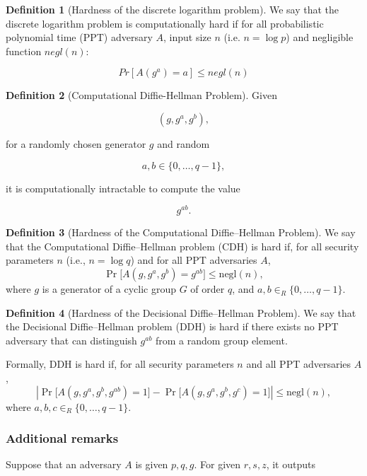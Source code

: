 \documentclass[11pt]{article}
\theoremstyle{definition}
\newtheorem{definition}{Definition}[section]
\theoremstyle{proof}
\begin{document}
\begin{definition}[Hardness of the discrete logarithm problem]
	We say that the discrete logarithm problem is computationally hard if for all probabilistic polynomial time (PPT) adversary $A$, input size $n$ (i.e. $n = \log p$) and negligible function $negl(n)$:
	
	$$
	Pr[A(g^a) = a] \le negl(n)
	$$
\end{definition}

\begin{definition}[Computational Diffie-Hellman Problem]
	Given
	
	$$
	(g, g^a, g^b),
	$$
	
	for a randomly chosen generator $g$ and random
	
	$$
	a, b \in \{0, \ldots, q-1\},
	$$
	
	
	it is computationally intractable to compute the value
	
	$$
	g^{ab}.
	$$
\end{definition}

\begin{definition}[Hardness of the Computational Diffie--Hellman Problem]		
	We say that the Computational Diffie--Hellman problem (CDH) is hard if, for all security parameters $n$ (i.e., $n = \log q$) and for all PPT adversaries $A$,
	$$
	\Pr\big[ A(g, g^a, g^b) = g^{ab} \big] \le \mathrm{negl}(n),
	$$
	where $g$ is a generator of a cyclic group $G$ of order $q$, and $a, b \in_R \{0, \ldots, q-1\}$.
\end{definition}

\begin{definition}[Hardness of the Decisional Diffie--Hellman Problem]
	We say that the Decisional Diffie--Hellman problem (DDH) is hard if there exists no PPT adversary that can distinguish $g^{ab}$ from a random group element.
	
	Formally, DDH is hard if, for all security parameters $n$ and all PPT adversaries $A$,
	$$
	\left|
	\Pr\big[ A(g, g^a, g^b, g^{ab}) = 1 \big]
	-
	\Pr\big[ A(g, g^a, g^b, g^c) = 1 \big]
	\right|
	\le \mathrm{negl}(n),
	$$
	where $a, b, c \in_R \{0, \ldots, q-1\}$.	
\end{definition}

\subsubsection{Additional remarks}

Suppose that an adversary $A$ is given $p, q, g$. For given $r, s, z$, it outputs
\end{document}
